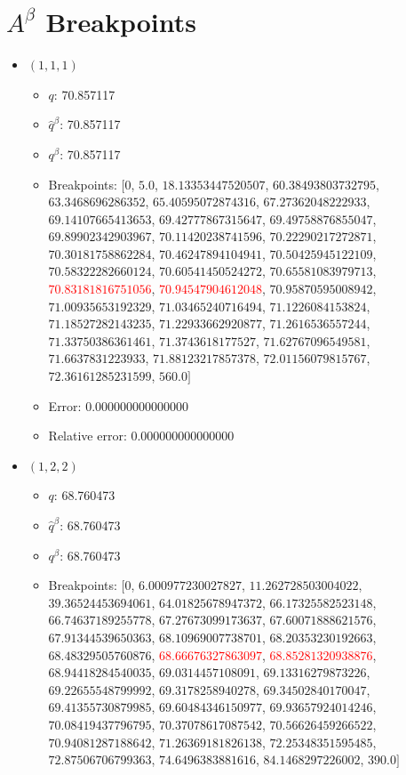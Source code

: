 \documentclass{article}%
\begin{document}
\section{$A^\beta$ Breakpoints}%
\thispagestyle{plain}%
\begin{itemize}%
	\item $(1, 1, 1)$%
	\begin{itemize}%
		\item $q$: 70.857117%
		\item $\hat{q}^\beta$: 70.857117%
		\item $q^\beta$: 70.857117%
		\item Breakpoints: $[$$0$, $5.0$, $18.13353447520507$, $60.38493803732795$, $63.3468696286352$, $65.40595072874316$, $67.27362048222933$, $69.14107665413653$, $69.42777867315647$, $69.49758876855047$, $69.89902342903967$, $70.11420238741596$, $70.22290217272871$, $70.30181758862284$, $70.46247894104941$, $70.50425945122109$, $70.58322282660124$, $70.60541450524272$, $70.65581083979713$, \textcolor{red}{$70.83181816751056$}, \textcolor{red}{$70.94547904612048$}, $70.95870595008942$, $71.00935653192329$, $71.03465240716494$, $71.1226084153824$, $71.18527282143235$, $71.22933662920877$, $71.2616536557244$, $71.33750386361461$, $71.3743618177527$, $71.62767096549581$, $71.6637831223933$, $71.88123217857378$, $72.01156079815767$, $72.36161285231599$, $560.0$$]$%
		\item Error: 0.000000000000000%
		\item Relative error: 0.000000000000000%
	\end{itemize}%
	\item $(1, 2, 2)$%
	\begin{itemize}%
		\item $q$: 68.760473%
		\item $\hat{q}^\beta$: 68.760473%
		\item $q^\beta$: 68.760473%
		\item Breakpoints: $[$$0$, $6.000977230027827$, $11.262728503004022$, $39.36524453694061$, $64.01825678947372$, $66.17325582523148$, $66.74637189255778$, $67.27673099173637$, $67.60071888621576$, $67.91344539650363$, $68.10969007738701$, $68.20353230192663$, $68.48329505760876$, \textcolor{red}{$68.66676327863097$}, \textcolor{red}{$68.85281320938876$}, $68.94418284540035$, $69.0314457108091$, $69.13316279873226$, $69.22655548799992$, $69.3178258940278$, $69.34502840170047$, $69.41355730879985$, $69.60484346150977$, $69.93657924014246$, $70.08419437796795$, $70.37078617087542$, $70.56626459266522$, $70.94081287188642$, $71.26369181826138$, $72.25348351595485$, $72.87506706799363$, $74.6496383881616$, $84.1468297226002$, $390.0$$]$%

\end{itemize}
\end{itemize}
\end{document}
